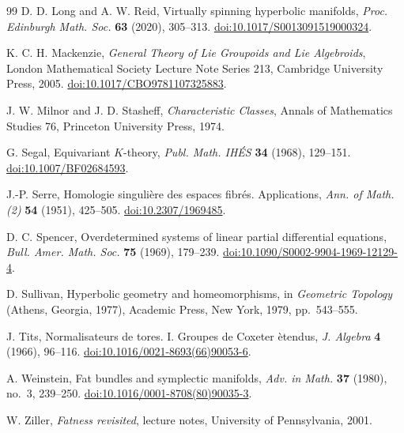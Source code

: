 \documentclass[11pt]{amsart}
\theoremstyle{plain}
\theoremstyle{definition}
\theoremstyle{remark}
\begin{document}
\begin{thebibliography}{99}
D. D. Long and A. W. Reid, Virtually spinning hyperbolic manifolds,
\emph{Proc. Edinburgh Math. Soc.} \textbf{63} (2020), 305--313.
\href{https://doi.org/10.1017/S0013091519000324}{doi:10.1017/S0013091519000324}.

K. C. H. Mackenzie, \emph{General Theory of Lie Groupoids and Lie Algebroids},
London Mathematical Society Lecture Note Series 213, Cambridge University Press, 2005.
\href{https://doi.org/10.1017/CBO9781107325883}{doi:10.1017/CBO9781107325883}.

J. W. Milnor and J. D. Stasheff, \emph{Characteristic Classes},
Annals of Mathematics Studies 76, Princeton University Press, 1974.

G. Segal, Equivariant $K$-theory,
\emph{Publ. Math. IH\'ES} \textbf{34} (1968), 129--151.
\href{https://doi.org/10.1007/BF02684593}{doi:10.1007/BF02684593}.

J.-P. Serre, Homologie singuli\`ere des espaces fibr\'es. Applications,
\emph{Ann. of Math. (2)} \textbf{54} (1951), 425--505.
\href{https://doi.org/10.2307/1969485}{doi:10.2307/1969485}.

D. C. Spencer, Overdetermined systems of linear partial differential equations,
\emph{Bull. Amer. Math. Soc.} \textbf{75} (1969), 179--239.
\href{https://doi.org/10.1090/S0002-9904-1969-12129-4}{doi:10.1090/S0002-9904-1969-12129-4}.

D. Sullivan, Hyperbolic geometry and homeomorphisms, in
\emph{Geometric Topology} (Athens, Georgia, 1977), Academic Press,
New York, 1979, pp.~543--555.

J. Tits, Normalisateurs de tores. I. Groupes de Coxeter \`etendus,
\emph{J. Algebra} \textbf{4} (1966), 96--116.
\href{https://doi.org/10.1016/0021-8693(66)90053-6}{doi:10.1016/0021-8693(66)90053-6}.

A. Weinstein, Fat bundles and symplectic manifolds,
\emph{Adv. in Math.} \textbf{37} (1980), no.~3, 239--250.
\href{https://doi.org/10.1016/0001-8708(80)90035-3}{doi:10.1016/0001-8708(80)90035-3}.

W. Ziller, \emph{Fatness revisited}, lecture notes,
University of Pennsylvania, 2001.
\end{thebibliography}
\end{document}

